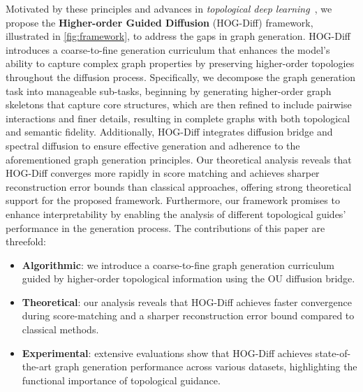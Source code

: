 Motivated by these principles and advances in \emph{topological deep learning}~\cite{hajij2022topological,TDL-position+ICML2024}, we propose the \textbf{Higher-order Guided Diffusion} (HOG-Diff) framework, illustrated in \cref{fig:framework}, to address the gaps in graph generation. 
HOG-Diff introduces a coarse-to-fine generation curriculum that enhances the model’s ability to capture complex graph properties by preserving higher-order topologies throughout the diffusion process.
% 
Specifically, we decompose the graph generation task into manageable sub-tasks, beginning by generating higher-order graph skeletons that capture core structures, which are then refined to include pairwise interactions and finer details, resulting in complete graphs with both topological and semantic fidelity.
%
Additionally, HOG-Diff integrates diffusion bridge and spectral diffusion to ensure effective generation and adherence to the aforementioned graph generation principles. 
%
Our theoretical analysis reveals that HOG-Diff converges more rapidly in score matching and achieves sharper reconstruction error bounds than classical approaches, offering strong theoretical support for the proposed framework.
Furthermore, our framework promises to enhance interpretability by enabling the analysis of different topological guides’ performance in the generation process.
%
%
The contributions of this paper are threefold:
\vspace{-0.1in}
\begin{itemize}[noitemsep, parsep=0.3pt, leftmargin=*]
\item \textbf{Algorithmic}: we introduce a coarse-to-fine graph generation curriculum guided by higher-order topological information using the OU diffusion bridge. 
\item \textbf{Theoretical}: our analysis reveals that HOG-Diff achieves faster convergence during score-matching and a sharper reconstruction error bound compared to classical methods.
\item \textbf{Experimental}: extensive evaluations show that HOG-Diff achieves state-of-the-art graph generation performance across various datasets, highlighting the functional importance of topological guidance.\vspace{-2mm}
\end{itemize}

